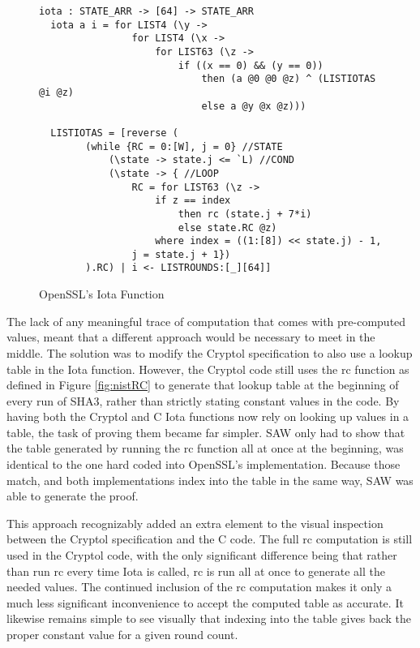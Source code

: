 \begin{figure}[h]
  \centering
\begin{lstlisting}[language=Cryptol]
  iota : STATE_ARR -> [64] -> STATE_ARR
  iota a i = for LIST4 (\y ->
                for LIST4 (\x ->
                    for LIST63 (\z ->
                        if ((x == 0) && (y == 0))
                            then (a @0 @0 @z) ^ (LISTIOTAS @i @z)
	                        else a @y @x @z)))

  LISTIOTAS = [reverse (
        (while {RC = 0:[W], j = 0} //STATE
            (\state -> state.j <= `L) //COND
            (\state -> { //LOOP
                RC = for LIST63 (\z ->
                    if z == index
                        then rc (state.j + 7*i)
                        else state.RC @z)
                    where index = ((1:[8]) << state.j) - 1,
                j = state.j + 1})
        ).RC) | i <- LISTROUNDS:[_][64]]
\end{lstlisting}
\caption{OpenSSL's Iota Function}
\label{fig:cryptolIota}
\end{figure}

The lack of any meaningful trace of computation that comes with pre-computed values, meant that a different approach would be necessary to meet in the middle.
The solution was to modify the Cryptol specification to also use a lookup table in the Iota function.
However, the Cryptol code still uses the rc function as defined in Figure \ref{fig:nistRC} to generate that lookup table at the beginning of every run of SHA3, rather than strictly stating constant values in the code.
By having both the Cryptol and C Iota functions now rely on looking up values in a table, the task of proving them became far simpler.
SAW only had to show that the table generated by running the rc function all at once at the beginning, was identical to the one hard coded into OpenSSL's implementation.
Because those match, and both implementations index into the table in the same way, SAW was able to generate the proof.

This approach recognizably added an extra element to the visual inspection between the Cryptol specification and the C code.
The full rc computation is still used in the Cryptol code, with the only significant difference being that rather than run rc every time Iota is called, rc is run all at once to generate all the needed values.
The continued inclusion of the rc computation makes it only a much less significant inconvenience to accept the computed table as accurate. 
It likewise remains simple to see visually that indexing into the table gives back the proper constant value for a given round count.

